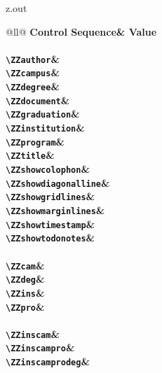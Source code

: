 \begin{VerbatimOut}{z.out}
\begin{tabular}{@{}ll@{}}
  \noalign{\vspace*{6pt}}
  \toprule
  \bfseries Control Sequence& \bfseries Value\\
  \midrule
  \\
  \verb+\ZZauthor+& \ZZauthor\\
  \verb+\ZZcampus+& \ZZcampus\\
  \verb+\ZZdegree+& \ZZdegree\\
  \verb+\ZZdocument+& \ZZdocument\\
  \verb+\ZZgraduation+& \ZZgraduation\\
  \verb+\ZZinstitution+& \ZZinstitution\\
  \verb+\ZZprogram+& \ZZprogram\\
  \verb+\ZZtitle+& \ZZtitle\\
  \noalign{\vspace*{6pt}}
  \verb+\ZZshowcolophon+& \ZZshowcolophon\\
  \verb+\ZZshowdiagonalline+& \ZZshowdiagonalline\\
  \verb+\ZZshowgridlines+& \ZZshowgridlines\\
  \verb+\ZZshowmarginlines+& \ZZshowmarginlines\\
  \verb+\ZZshowtimestamp+& \ZZshowtimestamp\\
  \verb+\ZZshowtodonotes+& \ZZshowtodonotes\\
  \noalign{\vspace*{12pt}}
  \\
  \verb+\ZZcam+& \ZZcam\\
  \verb+\ZZdeg+& \ZZdeg\\
  \verb+\ZZins+& \ZZins\\
  \verb+\ZZpro+& \ZZpro\\
  \noalign{\vspace*{12pt}}
  \\
  \verb+\ZZinscam+& \ZZinscam\\
  \verb+\ZZinscampro+& \ZZinscampro\\
  \verb+\ZZinscamprodeg+& \ZZinscamprodeg\\
  \bottomrule
\end{tabular}
\end{VerbatimOut}

\MyIO


